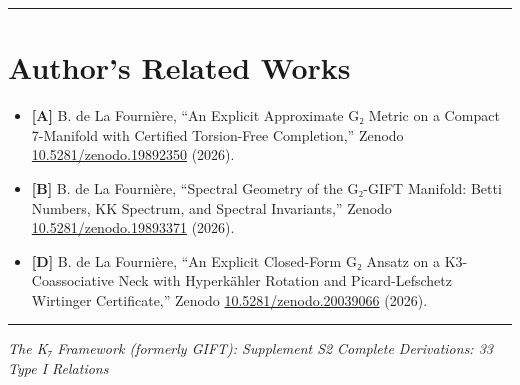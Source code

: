 \documentclass[11pt,a4paper]{article}
\begin{document}
\begin{center}\rule{\linewidth}{0.5pt}\end{center}

\section{Author's Related Works}\label{authors-related-works}

\begin{itemize}
\tightlist
\item
  \textbf{{[}A{]}} B. de La Fournière, ``An Explicit Approximate G₂ Metric on a Compact 7-Manifold with Certified Torsion-Free Completion,'' Zenodo \href{https://doi.org/10.5281/zenodo.19892350}{10.5281/zenodo.19892350} (2026).
\item
  \textbf{{[}B{]}} B. de La Fournière, ``Spectral Geometry of the G₂-GIFT Manifold: Betti Numbers, KK Spectrum, and Spectral Invariants,'' Zenodo \href{https://doi.org/10.5281/zenodo.19893371}{10.5281/zenodo.19893371} (2026).
\item
  \textbf{{[}D{]}} B. de La Fournière, ``An Explicit Closed-Form G₂ Ansatz on a K3-Coassociative Neck with Hyperkähler Rotation and Picard-Lefschetz Wirtinger Certificate,'' Zenodo \href{https://doi.org/10.5281/zenodo.20039066}{10.5281/zenodo.20039066} (2026).
\end{itemize}

\begin{center}\rule{\linewidth}{0.5pt}\end{center}

\emph{The K₇ Framework (formerly GIFT): Supplement S2} \emph{Complete Derivations: 33 Type I Relations}


\bigskip

\end{document}

